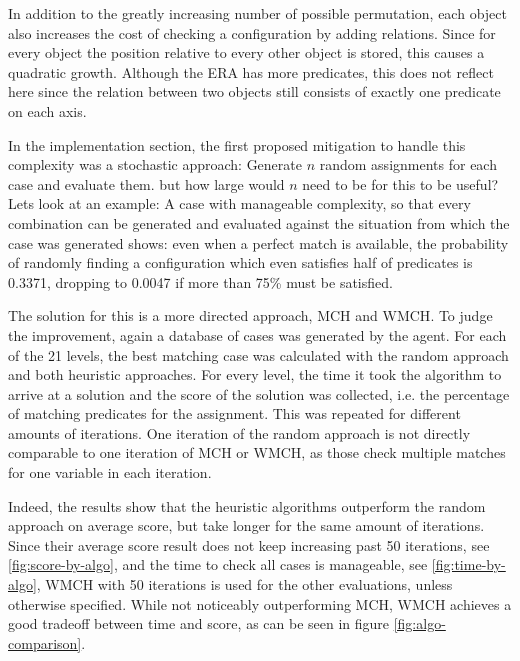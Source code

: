 In addition to the greatly increasing number of possible permutation, each object also increases the cost of checking a configuration by adding relations.
Since for every object the position relative to every other object is stored, this causes a quadratic growth. Although the ERA has more predicates, this does not reflect here since the relation between two objects still consists of exactly one predicate on each axis.


In the implementation section, the first proposed mitigation to handle this complexity was a stochastic approach: Generate $n$ random assignments for each case and evaluate them. but how large would $n$ need to be for this to be useful?
Lets look at an example: A case with manageable complexity, so that every combination can be generated and evaluated against the situation from which the case was generated shows: even when a perfect match is available, the probability of randomly finding a configuration which even satisfies half of predicates is 0.3371, dropping to 0.0047 if more than 75\% must be satisfied.


The solution for this is a more directed approach, \ac{MCH} and \ac{WMCH}. To judge the improvement, again a database of cases was generated by the agent.
For each of the 21 levels, the best matching case was calculated with the random approach and both heuristic approaches. For every level, the time it took the algorithm to arrive at a solution and the score of the solution was collected, i.e. the percentage of matching predicates for the assignment. This was repeated for different amounts of iterations. One iteration of the random approach is not directly comparable to one iteration of \ac{MCH} or \ac{WMCH}, as those check multiple matches for one variable in each iteration.

Indeed, the results show that the heuristic algorithms outperform the random approach on average score, but take longer for the same amount of iterations. Since their average score result does not keep increasing past 50 iterations, see \ref{fig:score-by-algo}, and the time to check all cases is manageable, see \ref{fig:time-by-algo}, \ac{WMCH} with 50 iterations is used for the other evaluations, unless otherwise specified.
While not noticeably outperforming \ac{MCH}, \ac{WMCH} achieves a good tradeoff between time and score, as can be seen in figure \ref{fig:algo-comparison}.

